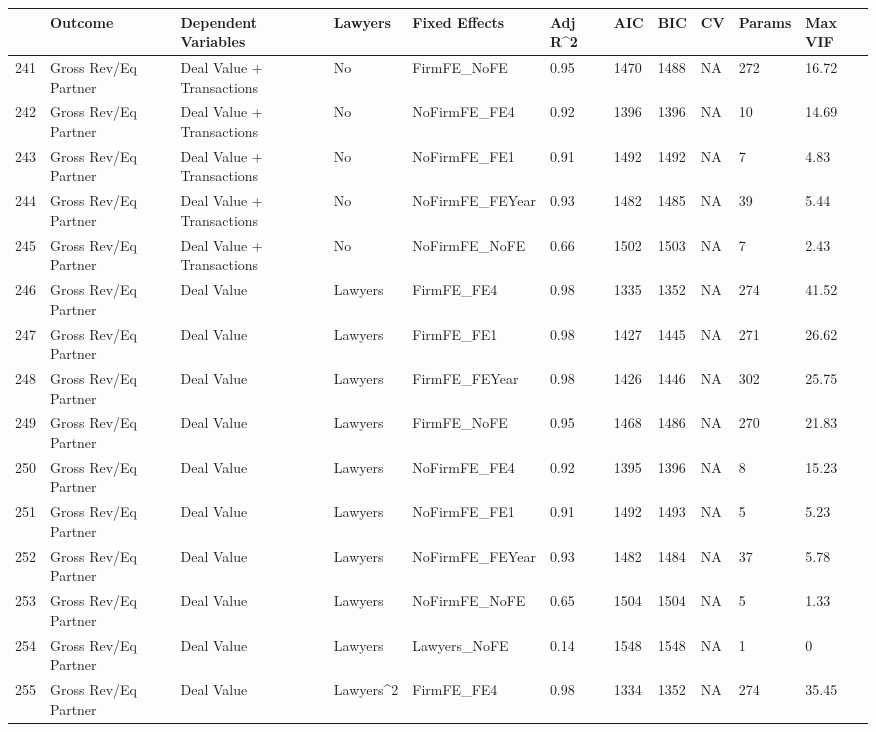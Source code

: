 \documentclass{article}
\begin{document}
\begin{table}[H]
\centering
\begin{tabular}{rllllllllll}
  \hline
 & Outcome & Dependent Variables & Lawyers & Fixed Effects & Adj R^2 & AIC & BIC & CV & Params & Max VIF \\ 
  \hline
241 & Gross Rev/Eq Partner & Deal Value + Transactions & No & FirmFE\_NoFE & 0.95 & 1470 & 1488 & NA & 272 & 16.72 \\ 
  242 & Gross Rev/Eq Partner & Deal Value + Transactions & No & NoFirmFE\_FE4 & 0.92 & 1396 & 1396 & NA & 10 & 14.69 \\ 
  243 & Gross Rev/Eq Partner & Deal Value + Transactions & No & NoFirmFE\_FE1 & 0.91 & 1492 & 1492 & NA & 7 & 4.83 \\ 
  244 & Gross Rev/Eq Partner & Deal Value + Transactions & No & NoFirmFE\_FEYear & 0.93 & 1482 & 1485 & NA & 39 & 5.44 \\ 
  245 & Gross Rev/Eq Partner & Deal Value + Transactions & No & NoFirmFE\_NoFE & 0.66 & 1502 & 1503 & NA & 7 & 2.43 \\ 
  246 & Gross Rev/Eq Partner & Deal Value & Lawyers & FirmFE\_FE4 & 0.98 & 1335 & 1352 & NA & 274 & 41.52 \\ 
  247 & Gross Rev/Eq Partner & Deal Value & Lawyers & FirmFE\_FE1 & 0.98 & 1427 & 1445 & NA & 271 & 26.62 \\ 
  248 & Gross Rev/Eq Partner & Deal Value & Lawyers & FirmFE\_FEYear & 0.98 & 1426 & 1446 & NA & 302 & 25.75 \\ 
  249 & Gross Rev/Eq Partner & Deal Value & Lawyers & FirmFE\_NoFE & 0.95 & 1468 & 1486 & NA & 270 & 21.83 \\ 
  250 & Gross Rev/Eq Partner & Deal Value & Lawyers & NoFirmFE\_FE4 & 0.92 & 1395 & 1396 & NA & 8 & 15.23 \\ 
  251 & Gross Rev/Eq Partner & Deal Value & Lawyers & NoFirmFE\_FE1 & 0.91 & 1492 & 1493 & NA & 5 & 5.23 \\ 
  252 & Gross Rev/Eq Partner & Deal Value & Lawyers & NoFirmFE\_FEYear & 0.93 & 1482 & 1484 & NA & 37 & 5.78 \\ 
  253 & Gross Rev/Eq Partner & Deal Value & Lawyers & NoFirmFE\_NoFE & 0.65 & 1504 & 1504 & NA & 5 & 1.33 \\ 
  254 & Gross Rev/Eq Partner & Deal Value & Lawyers & Lawyers\_NoFE & 0.14 & 1548 & 1548 & NA & 1 & 0 \\ 
  255 & Gross Rev/Eq Partner & Deal Value & Lawyers^2 & FirmFE\_FE4 & 0.98 & 1334 & 1352 & NA & 274 & 35.45 \\ 

\end{tabular}
\end{table}
\end{document}
